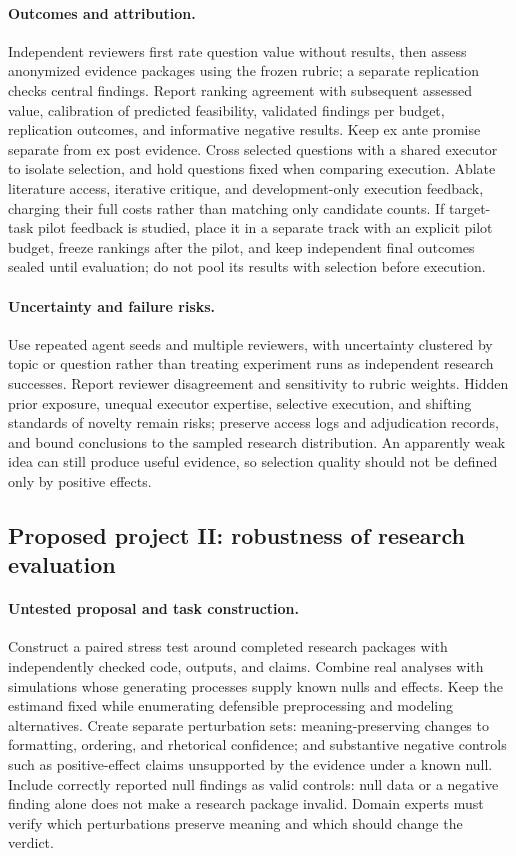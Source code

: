 \paragraph{Outcomes and attribution.}
Independent reviewers first rate question value without results, then assess anonymized evidence packages using the frozen rubric; a separate replication checks central findings. Report ranking agreement with subsequent assessed value, calibration of predicted feasibility, validated findings per budget, replication outcomes, and informative negative results. Keep ex ante promise separate from ex post evidence. Cross selected questions with a shared executor to isolate selection, and hold questions fixed when comparing execution. Ablate literature access, iterative critique, and development-only execution feedback, charging their full costs rather than matching only candidate counts. If target-task pilot feedback is studied, place it in a separate track with an explicit pilot budget, freeze rankings after the pilot, and keep independent final outcomes sealed until evaluation; do not pool its results with selection before execution.

\paragraph{Uncertainty and failure risks.}
Use repeated agent seeds and multiple reviewers, with uncertainty clustered by topic or question rather than treating experiment runs as independent research successes. Report reviewer disagreement and sensitivity to rubric weights. Hidden prior exposure, unequal executor expertise, selective execution, and shifting standards of novelty remain risks; preserve access logs and adjudication records, and bound conclusions to the sampled research distribution. An apparently weak idea can still produce useful evidence, so selection quality should not be defined only by positive effects.

\subsection{Proposed project II: robustness of research evaluation}

\paragraph{Untested proposal and task construction.}
Construct a paired stress test around completed research packages with independently checked code, outputs, and claims. Combine real analyses with simulations whose generating processes supply known nulls and effects. Keep the estimand fixed while enumerating defensible preprocessing and modeling alternatives. Create separate perturbation sets: meaning-preserving changes to formatting, ordering, and rhetorical confidence; and substantive negative controls such as positive-effect claims unsupported by the evidence under a known null. Include correctly reported null findings as valid controls: null data or a negative finding alone does not make a research package invalid. Domain experts must verify which perturbations preserve meaning and which should change the verdict.

